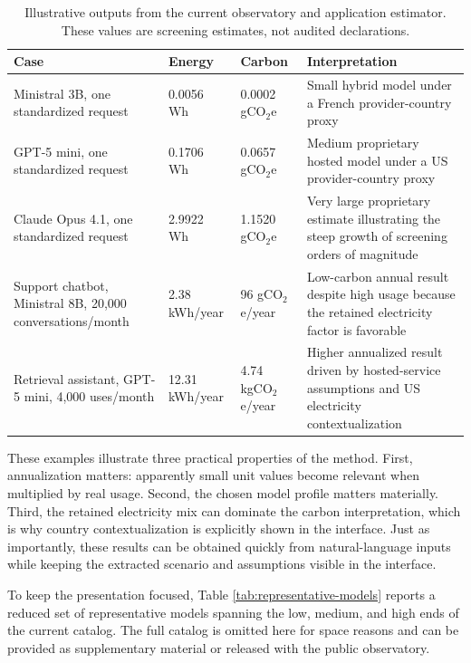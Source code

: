 \documentclass[runningheads]{llncs}
\begin{document}
\begin{table}[htbp]
\centering
\small
\begin{tabularx}{\textwidth}{|L{4.0cm}|L{2.5cm}|L{2.2cm}|Y|}
\hline
Case & Energy & Carbon & Interpretation \\
\hline
Ministral 3B, one standardized request & 0.0056 Wh & 0.0002 gCO$_2$e & Small hybrid model under a French provider-country proxy \\
\hline
GPT-5 mini, one standardized request & 0.1706 Wh & 0.0657 gCO$_2$e & Medium proprietary hosted model under a US provider-country proxy \\
\hline
Claude Opus 4.1, one standardized request & 2.9922 Wh & 1.1520 gCO$_2$e & Very large proprietary estimate illustrating the steep growth of screening orders of magnitude \\
\hline
Support chatbot, Ministral 8B, 20{,}000 conversations/month & 2.38 kWh/year & 96 gCO$_2$e/year & Low-carbon annual result despite high usage because the retained electricity factor is favorable \\
\hline
Retrieval assistant, GPT-5 mini, 4{,}000 uses/month & 12.31 kWh/year & 4.74 kgCO$_2$e/year & Higher annualized result driven by hosted-service assumptions and US electricity contextualization \\
\hline
\end{tabularx}
\caption{Illustrative outputs from the current observatory and application estimator. These values are screening estimates, not audited declarations.}
\label{tab:short-results-method}
\end{table}

These examples illustrate three practical properties of the method. First, annualization matters: apparently small unit values become relevant when multiplied by real usage. Second, the chosen model profile matters materially. Third, the retained electricity mix can dominate the carbon interpretation, which is why country contextualization is explicitly shown in the interface. Just as importantly, these results can be obtained quickly from natural-language inputs while keeping the extracted scenario and assumptions visible in the interface.

To keep the presentation focused, Table \ref{tab:representative-models} reports a reduced set of representative models spanning the low, medium, and high ends of the current catalog. The full catalog is omitted here for space reasons and can be provided as supplementary material or released with the public observatory.
\end{document}
